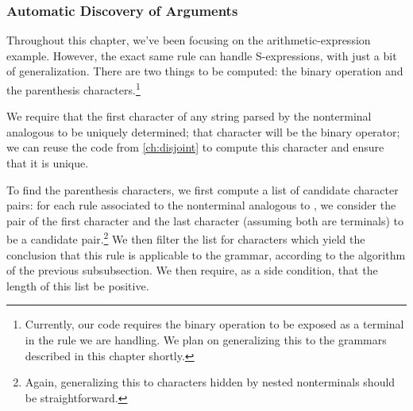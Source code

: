   \subsubsection{Automatic Discovery of Arguments}
    Throughout this chapter, we've been focusing on the arithmetic-expression example.  However, the exact same rule can handle S-expressions, with just a bit of generalization.  There are two things to be computed: the binary operation and the parenthesis characters.\footnote{Currently, our code requires the binary operation to be exposed as a terminal in the rule we are handling.  We plan on generalizing this to the grammars described in this chapter shortly.}
    
    We require that the first character of any string parsed by the nonterminal analogous to  be uniquely determined; that character will be the binary operator; we can reuse the code from \autoref{ch:disjoint} to compute this character and ensure that it is unique.
    
    To find the parenthesis characters, we first compute a list of candidate character pairs: for each rule associated to the nonterminal analogous to , we consider the pair of the first character and the last character (assuming both are terminals) to be a candidate pair.\footnote{Again, generalizing this to characters hidden by nested nonterminals should be straightforward.}  We then filter the list for characters which yield the conclusion that this rule is applicable to the grammar, according to the algorithm of the previous subsubsection.  We then require, as a side condition, that the length of this list be positive.
    

